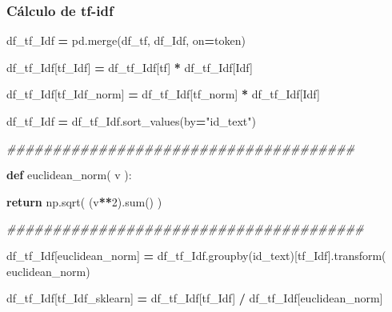 \documentclass[
  11pt,
  a4paper,
]{article}
\newenvironment{Shaded}{\begin{snugshade}}{\end{snugshade}}
\newcommand{\BuiltInTok}[1]{#1}
\newcommand{\CommentTok}[1]{\textcolor[rgb]{0.56,0.35,0.01}{\textit{#1}}}
\newcommand{\ControlFlowTok}[1]{\textcolor[rgb]{0.13,0.29,0.53}{\textbf{#1}}}
\newcommand{\DecValTok}[1]{\textcolor[rgb]{0.00,0.00,0.81}{#1}}
\newcommand{\KeywordTok}[1]{\textcolor[rgb]{0.13,0.29,0.53}{\textbf{#1}}}
\newcommand{\NormalTok}[1]{#1}
\newcommand{\OperatorTok}[1]{\textcolor[rgb]{0.81,0.36,0.00}{\textbf{#1}}}
\newcommand{\StringTok}[1]{\textcolor[rgb]{0.31,0.60,0.02}{#1}}
\begin{document}
\hypertarget{cuxe1lculo-de-tf-idf}{%
\subsubsection{Cálculo de tf-idf}\label{cuxe1lculo-de-tf-idf}}

\begin{Shaded}
\begin{Highlighting}[]
\NormalTok{df\_tf\_Idf }\OperatorTok{=}\NormalTok{ pd.merge(df\_tf, df\_Idf, on}\OperatorTok{=}\StringTok{\textquotesingle{}token\textquotesingle{}}\NormalTok{)}

\NormalTok{df\_tf\_Idf[}\StringTok{\textquotesingle{}tf\_Idf\textquotesingle{}}\NormalTok{] }\OperatorTok{=}\NormalTok{ df\_tf\_Idf[}\StringTok{\textquotesingle{}tf\textquotesingle{}}\NormalTok{] }\OperatorTok{*}\NormalTok{ df\_tf\_Idf[}\StringTok{\textquotesingle{}Idf\textquotesingle{}}\NormalTok{] }

\NormalTok{df\_tf\_Idf[}\StringTok{\textquotesingle{}tf\_Idf\_norm\textquotesingle{}}\NormalTok{] }\OperatorTok{=}\NormalTok{ df\_tf\_Idf[}\StringTok{\textquotesingle{}tf\_norm\textquotesingle{}}\NormalTok{] }\OperatorTok{*}\NormalTok{ df\_tf\_Idf[}\StringTok{\textquotesingle{}Idf\textquotesingle{}}\NormalTok{]}

\NormalTok{df\_tf\_Idf }\OperatorTok{=}\NormalTok{ df\_tf\_Idf.sort\_values(by}\OperatorTok{=}\StringTok{"id\_text"}\NormalTok{)}

\CommentTok{\#\#\#\#\#\#\#\#\#\#\#\#\#\#\#\#\#\#\#\#\#\#\#\#\#\#\#\#\#\#\#\#\#\#\#\#\#\#}

\KeywordTok{def}\NormalTok{ euclidean\_norm( v ):}

  \ControlFlowTok{return}\NormalTok{ np.sqrt( (v}\OperatorTok{**}\DecValTok{2}\NormalTok{).}\BuiltInTok{sum}\NormalTok{() )}
  
\CommentTok{\#\#\#\#\#\#\#\#\#\#\#\#\#\#\#\#\#\#\#\#\#\#\#\#\#\#\#\#\#\#\#\#\#\#\#\#\#\#\#}

\NormalTok{df\_tf\_Idf[}\StringTok{\textquotesingle{}euclidean\_norm\textquotesingle{}}\NormalTok{] }\OperatorTok{=}\NormalTok{ df\_tf\_Idf.groupby(}\StringTok{\textquotesingle{}id\_text\textquotesingle{}}\NormalTok{)[}\StringTok{\textquotesingle{}tf\_Idf\textquotesingle{}}\NormalTok{].transform( euclidean\_norm)}

\NormalTok{df\_tf\_Idf[}\StringTok{\textquotesingle{}tf\_Idf\_sklearn\textquotesingle{}}\NormalTok{] }\OperatorTok{=}\NormalTok{ df\_tf\_Idf[}\StringTok{\textquotesingle{}tf\_Idf\textquotesingle{}}\NormalTok{] }\OperatorTok{/}\NormalTok{ df\_tf\_Idf[}\StringTok{\textquotesingle{}euclidean\_norm\textquotesingle{}}\NormalTok{]}
\end{Highlighting}
\end{Shaded}
\end{document}

